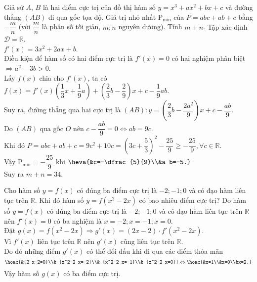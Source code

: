 \begin{ex}%
Giả sử $A$, $B$ là hai điểm cực trị của đồ thị hàm số $y=x^3+a x^2+b x+c$ và đường thẳng $(AB)$ đi qua gốc tọa độ. Giá trị nhỏ nhất $\mathrm{P}_{\min}$ của $P=a b c+a b+c$ bằng $-\dfrac{m}{n}$ (với $\dfrac{m}{n}$ là phân số tối giản, $m;n$ nguyên dương). Tính $m+n$.
\loigiai
{
Tập xác định $\mathscr{D}=\mathbb{R}$.\\
$f'(x)=3x^2+2ax+b$.\\
Điều kiện để hàm số có hai điểm cực trị là $f'(x)=0$ có hai nghiệm phân biệt $\Rightarrow a^2-3b>0$.\\
Lấy $f(x)$ chia cho $f'(x)$, ta có $f(x)=f'(x)\left(\dfrac{1}{3}x+\dfrac{1}{9}a\right)+\left(\dfrac{2}{3}b-\dfrac{2}{9}\right)x+c-\dfrac{1}{9}ab$.\\
Suy ra, đường thẳng qua hai cực trị là $(AB): y=\left(\dfrac{2}{3} b-\dfrac{2a^2}{9}\right) x+c-\dfrac{a b}{9}$.\\
Do $(AB)$ qua gốc $O$ nên $c-\dfrac{a b}{9}=0\Leftrightarrow a b=9c$.\\
Khi đó $P=a b c+a b+c=9c^2+10c=\left(3c+\dfrac{5}{3}\right)^2-\dfrac{25}{9}\ge-\dfrac{25}{9},\forall c\in\mathbb{R}$.\\
Vậy $\mathrm{P}_{\text{min}}=-\dfrac{25}{9}$ khi $\heva{&c=-\dfrac{5}{9}\\&a b=-5.}$\\
Suy ra $m+n=34$.
}
\end{ex}

\begin{ex}%
Cho hàm số $y=f(x)$ có đúng ba điểm cực trị là $-2;-1;0$ và có đạo hàm liên tục trên $\mathbb{R}$. Khi đó hàm số $y=f\left(x^2-2x\right)$ có bao nhiêu điểm cực trị?
\loigiai
{
Do hàm số $y=f(x)$ có đúng ba điểm cực trị là $-2;-1;0$ và có đạo hàm liên tục trên $\mathbb{R}$ nên $f'(x)=0$ có ba nghiệm là $x=-2;x=-1;x=0$.\\
Đặt $g(x)=f\left(x^2-2x\right)\Rightarrow g'(x)=(2x-2)\cdot f'\left(x^2-2x\right)$. \\
Vì $f'(x)$ liên tục trên $\mathbb{R}$ nên $g'(x)$ cũng liên tục trên $\mathbb{R}$.\\
Do đó những điểm $g'(x)$ có thể đổi dấu khi đi qua các điểm thỏa mãn
$$\hoac{&{2 x-2=0}\\&
{x^2-2 x=-2}\\&
{x^2-2 x=-1}\\&
{x^2-2 x=0}}
\Leftrightarrow\hoac{&x=1\\&x=0\\&x=2.}$$
Vậy hàm số $g(x)$ có ba điểm cực trị.
}
\end{ex}

